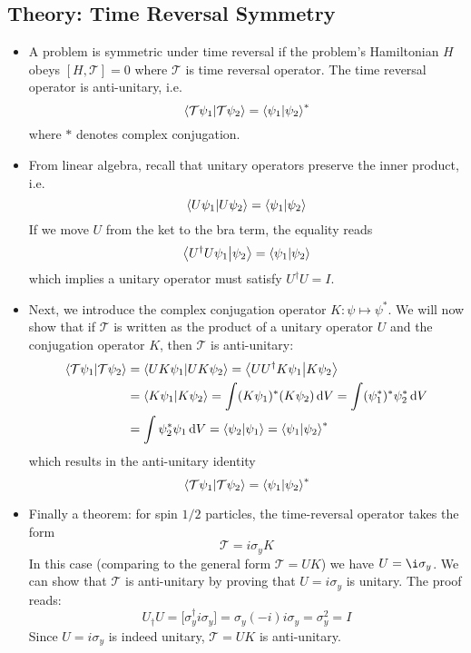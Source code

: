 \documentclass[11pt, a4paper]{article}
\newcommand{\diff}{\mathop{}\!\mathrm{d}} %
\newcommand{\T}{\mathcal{T}}  %
\newcommand{\bbraket}[2]{\big \langle {#1} \big | {#2} \big \rangle}  %
\begin{document}
\subsection{Theory: Time Reversal Symmetry}
\begin{itemize}
	\item A problem is symmetric under time reversal if the problem's Hamiltonian $ H $ obeys $ [H, \T] = 0 $ where $ \T $ is time reversal operator. The time reversal operator is anti-unitary, i.e.
	\begin{equation*}
		\braket{\T\psi_{1}}{\T\psi_{2}} = \braket{\psi_{1}}{\psi_{2}}^{*}
	\end{equation*}
	where $ * $ denotes complex conjugation.
	
	\item From linear algebra, recall that unitary operators preserve the inner product, i.e.
	\begin{equation*}
		\braket{U\psi_{1}}{U\psi_{2}} = \braket{\psi_{1}}{\psi_{2}} 
	\end{equation*}
	If we move $ U $ from the ket to the bra term, the equality reads
	\begin{equation*}
		\bbraket{U^{\dagger}U\psi_{1}}{\psi_{2}} = \braket{\psi_{1}}{\psi_{2}} 
	\end{equation*}
	which implies a unitary operator must satisfy $ U^{\dagger}U = I $.
	
	\item Next, we introduce the complex conjugation operator $ K: \psi \mapsto \psi^{*} $. We will now show that if $ \T $ is written as the product of a unitary operator $ U $ and the conjugation operator $ K $, then $ \T $ is anti-unitary:
	\begin{align*}
		\braket{\T\psi_{1}}{\T\psi_{2}} &= \braket{UK\psi_{1}}{UK\psi_{2}} = \bbraket{UU^{\dagger}K\psi_{1}}{K\psi_{2}}\\
		&= \braket{K\psi_{1}}{K\psi_{2}} = \int (K\psi_{1})^{*} (K\psi_{2})\diff V = \int (\psi_{1}^{*})^{*}\psi_{2}^{*}\diff V\\
		&= \int \psi_{2}^{*}\psi_{1}\diff V = \braket{\psi_{2}}{\psi_{1}} = \braket{\psi_{1}}{\psi_{2}}^{*}
	\end{align*}
	which results in the anti-unitary identity 
	\begin{equation*}
		\braket{\T\psi_{1}}{\T\psi_{2}} = \braket{\psi_{1}}{\psi_{2}}^{*}
	\end{equation*}
	
	\item Finally a theorem: for spin $ 1/2 $ particles, the time-reversal operator takes the form
	\begin{equation*}
		\T = i\sigma_{y}K
	\end{equation*}
	In this case (comparing to the general form $ \T = UK $) we have $ U = \i \sigma_{y} $. We can show that $ \T $ is anti-unitary by proving that $ U = i \sigma_{y} $ is unitary. The proof reads:
	\begin{equation*}
		U_{\dagger}U = \big[\sigma_{y}^{\dagger} i \sigma_{y}\big] = \sigma_{y} (-i) i \sigma_{y} = \sigma_{y}^{2} = I
	\end{equation*}
	Since $ U = i \sigma_{y} $ is indeed unitary, $ \T = UK $ is anti-unitary.
\end{itemize}
	
\end{document}
